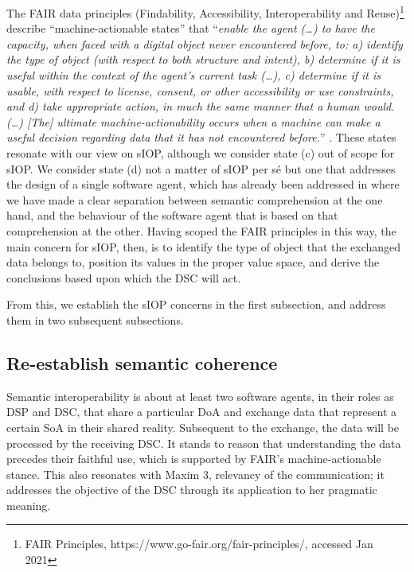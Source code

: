 \documentclass[sort&compress,preprint,authoryear,3p,twocolumn]{elsarticle}
\begin{document}
The FAIR data principles (Findability, Accessibility, Interoperability
and Reuse)\footnote{FAIR Principles,
  https://www.go-fair.org/fair-principles/, accessed Jan 2021} describe
``machine-actionable states'' that ``\emph{enable the agent (\ldots) to
have the capacity, when faced with a digital object never encountered
before, to: a) identify the type of object (with respect to both
structure and intent), b) determine if it is useful within the context
of the agent's current task (\ldots), c) determine if it is usable, with
respect to license, consent, or other accessibility or use constraints,
and d) take appropriate action, in much the same manner that a human
would. (\ldots) {[}The{]} ultimate machine-actionability occurs when a
machine can make a useful decision regarding data that it has not
encountered before.}'' \citep{Wilkinson2016}. These states resonate with
our view on sIOP, although we consider state (c) out of scope for sIOP.
We consider state (d) not a matter of sIOP per sé but one that addresses
the design of a single software agent, which has already been addressed
in \citep[DP 2]{Brandt2021a} where we have made a clear separation
between semantic comprehension at the one hand, and the behaviour of the
software agent that is based on that comprehension at the other. Having
scoped the FAIR principles in this way, the main concern for sIOP, then,
is to identify the type of object that the exchanged data belongs to,
position its values in the proper value space, and derive the
conclusions based upon which the DSC will act.

From this, we establish the sIOP concerns in the first subsection, and
address them in two subsequent subsections.

\hypertarget{re-establish-semantic-coherence}{%
\subsection{Re-establish semantic
coherence}\label{re-establish-semantic-coherence}}

Semantic interoperability is about at least two software agents, in
their roles as DSP and DSC, that share a particular DoA and exchange
data that represent a certain SoA in their shared reality. Subsequent to
the exchange, the data will be processed by the receiving DSC. It stands
to reason that understanding the data precedes their faithful use, which
is supported by FAIR's machine-actionable stance. This also resonates
with Maxim 3, relevancy of the communication; it addresses the objective
of the DSC through its application to her pragmatic meaning.
\end{document}
